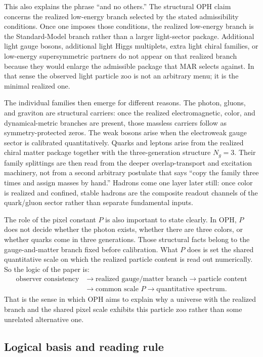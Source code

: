 \documentclass[11pt]{article}
\begin{document}
This also explains the phrase ``and no others.'' The structural OPH claim concerns the realized
low-energy branch selected by the stated admissibility conditions. Once one imposes those
conditions, the realized low-energy branch is the
Standard-Model branch rather than a larger light-sector package. Additional light gauge bosons,
additional light Higgs multiplets, extra light chiral families, or low-energy supersymmetric
partners do not appear on that realized branch because they would enlarge the admissible package
that MAR selects against. In that sense the observed light particle zoo is not an arbitrary menu;
it is the minimal realized one.

The individual families then emerge for different reasons. The photon, gluons, and graviton are
structural carriers: once the realized electromagnetic, color, and dynamical-metric branches are
present, those massless carriers follow as symmetry-protected zeros. The weak bosons arise when
the electroweak gauge sector is calibrated quantitatively. Quarks and leptons arise from the
realized chiral matter package together with the three-generation structure \(N_g=3\). Their
family splittings are then read from the deeper overlap-transport and excitation machinery, not
from a second arbitrary postulate that says ``copy the family three times and assign masses by
hand.'' Hadrons come one layer later still: once color is realized and confined, stable hadrons
are the composite readout channels of the quark/gluon sector rather than separate fundamental
inputs.

The role of the pixel constant \(P\) is also important to state clearly. In OPH, \(P\) does not
decide whether the photon exists, whether there are three colors, or whether quarks come in three
generations. Those structural facts belong to the gauge-and-matter branch fixed before
calibration. What \(P\) does is set the shared quantitative scale on which the realized particle
content is read out numerically. So the logic of the paper is:
\[
\begin{aligned}
\text{observer consistency}
&\to
\text{realized gauge/matter branch}
\to
\text{particle content} \\
&\to
\text{common scale }P
\to
\text{quantitative spectrum}.
\end{aligned}
\]
That is the sense in which OPH aims to explain why a universe with the realized branch and the
shared pixel scale exhibits this particle zoo rather than some unrelated alternative one.

\subsection{Logical basis and reading rule}
\end{document}
